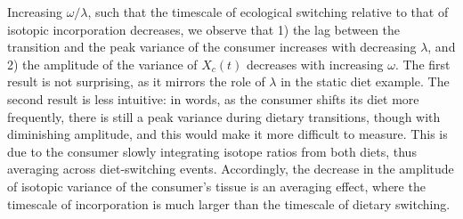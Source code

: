 \documentclass{frontiersSCNS}
\begin{document}
Increasing $\omega/\lambda$, such that the timescale of ecological switching relative to that of isotopic incorporation decreases, we observe that
1) the lag between the transition and the peak variance of the consumer increases with decreasing $\lambda$, and
2) the amplitude of the variance of $X_c(t)$ decreases with increasing $\omega$.
The first result is not surprising, as it mirrors the role of $\lambda$ in the static diet example. %
The second result is less intuitive: in words, as the consumer shifts its diet more frequently, there is still a peak variance during dietary transitions, though with diminishing amplitude, and this would make it more difficult to measure.
This is due to the consumer slowly integrating isotope ratios from both diets, thus averaging across diet-switching events.
Accordingly, the decrease in the amplitude of isotopic variance of the consumer's tissue is an averaging effect, where the timescale of incorporation is much larger than the timescale of dietary switching.
\end{document}

